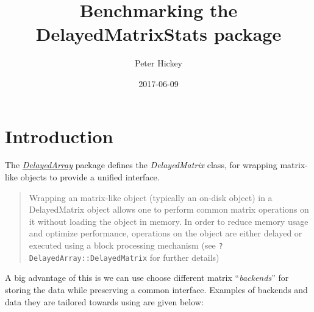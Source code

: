 \documentclass[]{book}
\title{Benchmarking the DelayedMatrixStats package}
\author{Peter Hickey}
\date{2017-06-09}
\begin{document}
\maketitle

{
\setcounter{tocdepth}{1}
\tableofcontents
}
\chapter{Introduction}\label{introduction}

The
\emph{\href{http://bioconductor.org/packages/DelayedArray}{DelayedArray}}
package defines the \emph{DelayedMatrix} class, for wrapping matrix-like
objects to provide a unified interface.

\begin{quote}
Wrapping an matrix-like object (typically an on-disk object) in a
DelayedMatrix object allows one to perform common matrix operations on
it without loading the object in memory. In order to reduce memory usage
and optimize performance, operations on the object are either delayed or
executed using a block processing mechanism (see
\texttt{?DelayedArray::DelayedMatrix} for further details)
\end{quote}

A big advantage of this is we can use choose different matrix
``\emph{backends}'' for storing the data while preserving a common
interface. Examples of backends and data they are tailored towards using
are given below:
\end{document}
